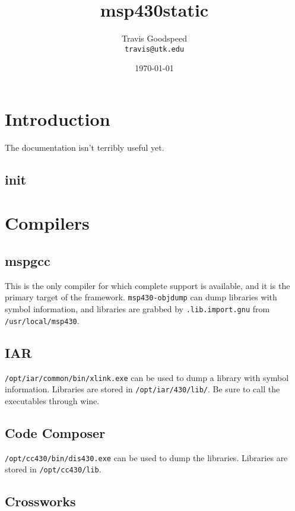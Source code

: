 \documentclass[]{book}
\title{msp430static}
\author{Travis Goodspeed\\{\tt travis@utk.edu}}
\date{\today}
\begin{document}
\maketitle

\chapter{Introduction}

The documentation isn't terribly useful yet.

\section{init}


\chapter{Compilers}

\section{mspgcc}

This is the only compiler for which complete support is available,
and it is the primary target of the framework.  {\tt msp430-objdump}
can dump libraries with symbol information, and libraries are grabbed
by {\tt .lib.import.gnu} from {\tt /usr/local/msp430}.

\section{IAR}


{\tt /opt/iar/common/bin/xlink.exe} can be used to dump a library with symbol information.
Libraries are stored in {\tt /opt/iar/430/lib/}.  Be sure to call the
executables through wine.

\section{Code Composer}


{\tt /opt/cc430/bin/dis430.exe} can be used to dump the libraries.
Libraries are stored in {\tt /opt/cc430/lib}.

\section{Crossworks}
\end{document}
